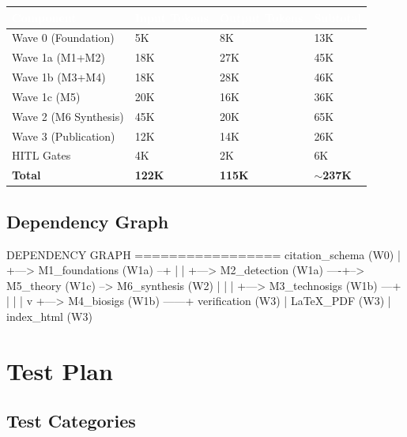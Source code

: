 \documentclass[11pt,letterpaper]{article}
\newcommand{\tableheader}[1]{\textbf{\sffamily\textcolor{white}{#1}}}
\begin{document}
\begin{center}
\begin{tabularx}{\textwidth}{L{4cm}C{2.5cm}C{2.5cm}C{2.5cm}}
\toprule
{}
\tableheader{Component} & \tableheader{Input Tokens} & \tableheader{Output Tokens} & \tableheader{Subtotal} \\
\midrule
Wave 0 (Foundation) & 5K & 8K & 13K \\
Wave 1a (M1+M2) & 18K & 27K & 45K \\
Wave 1b (M3+M4) & 18K & 28K & 46K \\
Wave 1c (M5) & 20K & 16K & 36K \\
Wave 2 (M6 Synthesis) & 45K & 20K & 65K \\
Wave 3 (Publication) & 12K & 14K & 26K \\
HITL Gates & 4K & 2K & 6K \\
\midrule
\textbf{Total} & \textbf{122K} & \textbf{115K} & \textbf{$\sim$237K} \\
\bottomrule
\end{tabularx}
\end{center}

\subsection{Dependency Graph}

\begin{asciibox}
DEPENDENCY GRAPH
=================
citation_schema (W0)
      |
      +---> M1_foundations (W1a) --+
      |                            |
      +---> M2_detection (W1a) ----+--> M5_theory (W1c) --> M6_synthesis (W2)
      |                            |                              |
      +---> M3_technosigs (W1b) ---+                             |
      |                            |                             v
      +---> M4_biosigs (W1b) ------+                    verification (W3)
                                                                  |
                                                         LaTeX_PDF (W3)
                                                                  |
                                                          index_html (W3)
\end{asciibox}

\section{Test Plan}

\subsection{Test Categories}
\end{document}
